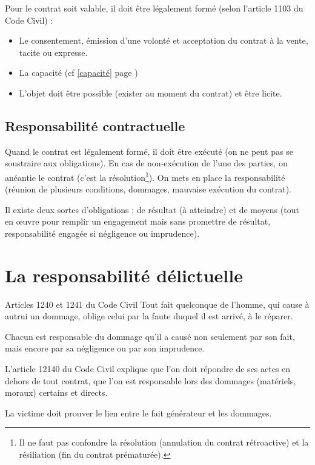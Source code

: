 \documentclass[10pt,a4paper]{article}
\begin{document}
Pour le contrat soit valable, il doit être légalement formé (selon l'article 1103 du Code Civil) :
\begin{itemize}
\item Le consentement, émission d'une volonté et acceptation du contrat à la vente, tacite ou expresse.
\item La capacité (cf \ref{capacité} page \pageref{capacité})
\item L'objet doit être possible (exister au moment du contrat) et être licite.
\end{itemize}

\subsection{Responsabilité contractuelle}

Quand le contrat est légalement formé, il doit être exécuté (on ne peut pas se soustraire aux obligations).
En cas de non-exécution de l'une des parties, on anéantie le contrat (c'est la résolution\footnote{Il ne faut pas confondre la résolution (annulation du contrat rétroactive) et la résiliation (fin du contrat prématurée).}).
On mets en place la responsabilité (réunion de plusieurs conditions, dommages, mauvaise exécution du contrat).

Il existe deux sortes d'obligations : de résultat (à atteindre) et de moyens (tout en œuvre pour remplir un engagement mais sans promettre de résultat, responsabilité engagée si négligence ou imprudence).

\section{La responsabilité délictuelle}

\begin{aquote}{Articles 1240 et 1241 du Code Civil}
Tout fait quelconque de l'homme, qui cause à autrui un dommage, oblige celui par la faute duquel il est arrivé, à le réparer.

Chacun est responsable du dommage qu'il a causé non seulement par son fait, mais encore par sa négligence ou par son imprudence.
\end{aquote}

L'article 12140 du Code Civil explique que l'on doit répondre de ses actes en dehors de tout contrat, que l'on est responsable lors des dommages (matériels, moraux) certains et directs.

La victime doit prouver le lien entre le fait générateur et les dommages.
\end{document}
